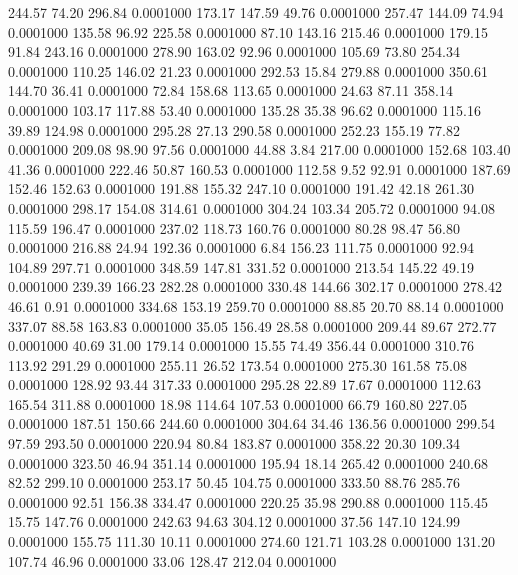  244.57   74.20  296.84   0.0001000
 173.17  147.59   49.76   0.0001000
 257.47  144.09   74.94   0.0001000
 135.58   96.92  225.58   0.0001000
  87.10  143.16  215.46   0.0001000
 179.15   91.84  243.16   0.0001000
 278.90  163.02   92.96   0.0001000
 105.69   73.80  254.34   0.0001000
 110.25  146.02   21.23   0.0001000
 292.53   15.84  279.88   0.0001000
 350.61  144.70   36.41   0.0001000
  72.84  158.68  113.65   0.0001000
  24.63   87.11  358.14   0.0001000
 103.17  117.88   53.40   0.0001000
 135.28   35.38   96.62   0.0001000
 115.16   39.89  124.98   0.0001000
 295.28   27.13  290.58   0.0001000
 252.23  155.19   77.82   0.0001000
 209.08   98.90   97.56   0.0001000
  44.88    3.84  217.00   0.0001000
 152.68  103.40   41.36   0.0001000
 222.46   50.87  160.53   0.0001000
 112.58    9.52   92.91   0.0001000
 187.69  152.46  152.63   0.0001000
 191.88  155.32  247.10   0.0001000
 191.42   42.18  261.30   0.0001000
 298.17  154.08  314.61   0.0001000
 304.24  103.34  205.72   0.0001000
  94.08  115.59  196.47   0.0001000
 237.02  118.73  160.76   0.0001000
  80.28   98.47   56.80   0.0001000
 216.88   24.94  192.36   0.0001000
   6.84  156.23  111.75   0.0001000
  92.94  104.89  297.71   0.0001000
 348.59  147.81  331.52   0.0001000
 213.54  145.22   49.19   0.0001000
 239.39  166.23  282.28   0.0001000
 330.48  144.66  302.17   0.0001000
 278.42   46.61    0.91   0.0001000
 334.68  153.19  259.70   0.0001000
  88.85   20.70   88.14   0.0001000
 337.07   88.58  163.83   0.0001000
  35.05  156.49   28.58   0.0001000
 209.44   89.67  272.77   0.0001000
  40.69   31.00  179.14   0.0001000
  15.55   74.49  356.44   0.0001000
 310.76  113.92  291.29   0.0001000
 255.11   26.52  173.54   0.0001000
 275.30  161.58   75.08   0.0001000
 128.92   93.44  317.33   0.0001000
 295.28   22.89   17.67   0.0001000
 112.63  165.54  311.88   0.0001000
  18.98  114.64  107.53   0.0001000
  66.79  160.80  227.05   0.0001000
 187.51  150.66  244.60   0.0001000
 304.64   34.46  136.56   0.0001000
 299.54   97.59  293.50   0.0001000
 220.94   80.84  183.87   0.0001000
 358.22   20.30  109.34   0.0001000
 323.50   46.94  351.14   0.0001000
 195.94   18.14  265.42   0.0001000
 240.68   82.52  299.10   0.0001000
 253.17   50.45  104.75   0.0001000
 333.50   88.76  285.76   0.0001000
  92.51  156.38  334.47   0.0001000
 220.25   35.98  290.88   0.0001000
 115.45   15.75  147.76   0.0001000
 242.63   94.63  304.12   0.0001000
  37.56  147.10  124.99   0.0001000
 155.75  111.30   10.11   0.0001000
 274.60  121.71  103.28   0.0001000
 131.20  107.74   46.96   0.0001000
  33.06  128.47  212.04   0.0001000

